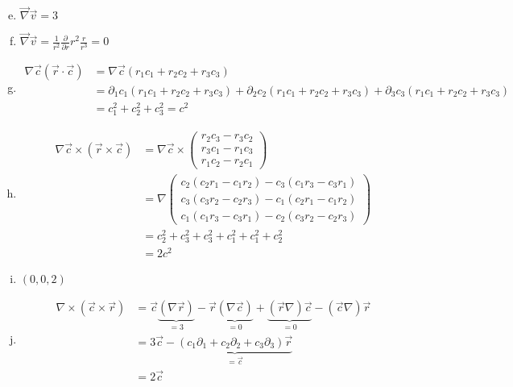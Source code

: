 \documentclass[a4paper,german,12pt,smallheadings]{scrartcl}
\begin{document}
\begin{enumerate}[a)]
  \setcounter{enumi}{4}
  \item $\vec{\nabla} \vec{v} = 3$
  \item $\vec{\nabla} \vec{v} = \frac{1}{r^2} \frac{\partial}{\partial r} r^2 \frac{r}{r^3} = 0$
  \item
    \begin{align*}
      \nabla \vec{c}(\vec{r} \cdot \vec{c})
      &= \nabla \vec{c}(r_1c_1 + r_2c_2 + r_3c_3) \\
      & = \partial_1 c_1 (r_1c_1 + r_2c_2 + r_3c_3) +
      \partial_2 c_2 (r_1c_1 + r_2c_2 + r_3c_3) +
      \partial_3 c_3 (r_1c_1 + r_2c_2 + r_3c_3) \\
      &= c_1^2 + c_2^2 + c_3^2 = c^2
    \end{align*}
  \item
    \begin{align*}
      \nabla \vec{c} \times (\vec{r} \times \vec{c})
      &= \nabla \vec{c} \times \begin{pmatrix}
        r_2c_3 - r_3c_2 \\
        r_3c_1 - r_1c_3 \\
        r_1c_2 - r_2c_1
      \end{pmatrix} \\
      &= \nabla \begin{pmatrix}
        c_2(c_2r_1 - c_1r_2) - c_3(c_1r_3 - c_3r_1) \\
        c_3(c_3r_2 - c_2r_3) - c_1(c_2r_1 - c_1r_2) \\
        c_1(c_1r_3 - c_3r_1) - c_2(c_3r_2 - c_2r_3)
      \end{pmatrix} \\
      &= c_2^2 + c_3^2 + c_3^2 + c_1^2 + c_1^2 + c_2^2 \\
      &= 2c^2
    \end{align*}

  \item $(0,0,2)$
  \item
    \begin{align*}
    \nabla \times (\vec{c} \times \vec{r})
    &= \vec{c} \underbrace{(\nabla \vec{r})}_{=3}
      - \vec{r} \underbrace{(\nabla \vec{c})}_{=0}
      + \underbrace{(\vec{r} \nabla) \vec{c}}_{=0}
      - (\vec{c} \nabla) \vec{r} \\
    &= 3\vec{c} - \underbrace{(c_1\partial_1 + c_2\partial_2 + c_3\partial_3) \vec{r}}_{= \vec{c}} \\
    &= 2\vec{c}
    \end{align*}
\end{enumerate}
\end{document}
